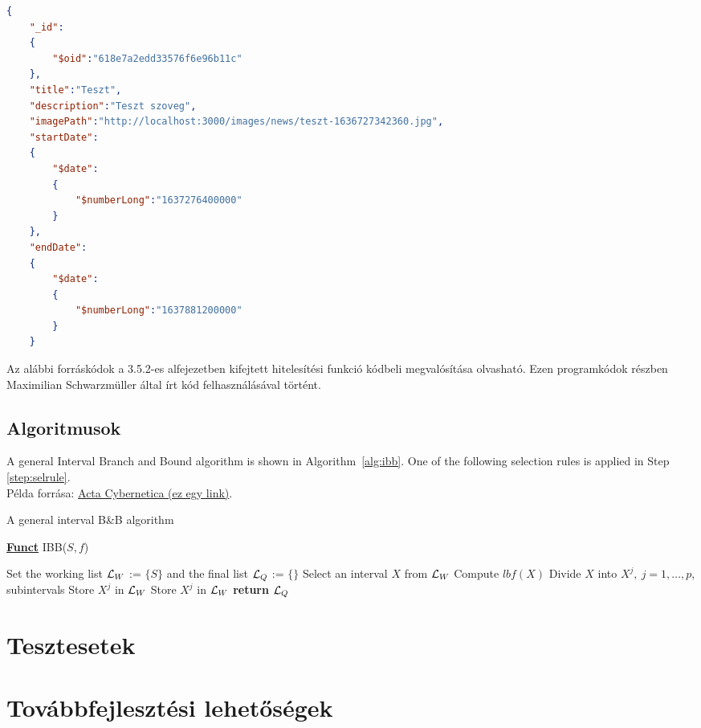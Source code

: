 \begin{lstlisting}[language={JSON}]
{
	"_id":
	{
		"$oid":"618e7a2edd33576f6e96b11c"
	},
	"title":"Teszt",
	"description":"Teszt szoveg",
	"imagePath":"http://localhost:3000/images/news/teszt-1636727342360.jpg",
	"startDate":
	{
		"$date":
		{
			"$numberLong":"1637276400000"
		}
	},
	"endDate":
	{
		"$date":
		{
			"$numberLong":"1637881200000"
		}
	}
\end{lstlisting}

Az alábbi forráskódok a 3.5.2-es alfejezetben kifejtett hitelesítési funkció kódbeli megvalósítása olvasható. Ezen programkódok részben Maximilian Schwarzmüller által írt kód felhasználásával történt.




\subsection{Algoritmusok} %

A general Interval Branch and Bound algorithm is shown in Algorithm~\ref{alg:ibb}. One of the following selection rules is applied in Step \ref{step:selrule}.\\
Példa forrása: \href{https://www.inf.u-szeged.hu/actacybernetica/}{Acta Cybernetica (ez egy link)}.

\begin{algorithm}[H]
\caption{A general interval B\&B algorithm} 
\label{alg:ibb} 
\textbf{\underline{Funct}} IBB($S,f$)
\begin{algorithmic}[1] %
\State Set the working list ${\cal L}_W$ := $\{S\}$ and the final list ${\cal L}_Q$ := $\{\}$     
 \label{alg:igoend}
	\State  Select an interval $X$ from ${\cal L}_W$ \label{step:selrule}  
	\State Compute $lbf(X)$ 		  
	 
		\State Divide $X$ into $X^j,\ j=1,\dots, p$, subintervals   
			 
				\State Store $X^j$ in ${\cal L}_W$ 
			\Else
				\State Store $X^j$ in ${\cal L}_W$ 
			\EndIf
		\EndFor  
	\EndIf
\EndWhile
\State \textbf{return} ${\cal L}_Q$
\end{algorithmic}
\end{algorithm}

\section{Tesztesetek}

\section{Továbbfejlesztési lehetőségek}